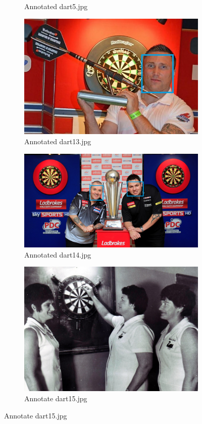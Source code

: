 \documentclass{article}
\begin{document}
\begin{figure}[h!]
\begin{subfigure}[b]{0.25\linewidth}
          \caption{Annotated dart5.jpg}
        \end{subfigure}
        \begin{subfigure}[b]{0.3\linewidth}
          \includegraphics[width=\linewidth]{dart13_faces.png}
          \caption{Annotated dart13.jpg}
        \end{subfigure}
        \begin{subfigure}[b]{0.4\linewidth}
          \includegraphics[width=\linewidth]{dart14_faces.png}
          \caption{Annotated dart14.jpg}
        \end{subfigure}
        \begin{subfigure}[b]{0.3\linewidth}
          \includegraphics[width=\linewidth]{dart15_faces.png}
          \caption{Annotate dart15.jpg}
        \end{subfigure}
      \end{figure}
\end{document}
